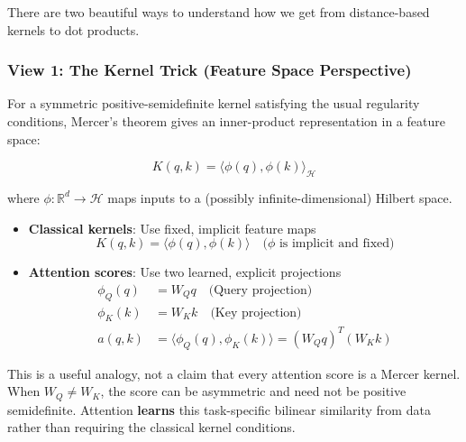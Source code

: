 \documentclass{article}
\begin{document}
There are two beautiful ways to understand how we get from distance-based kernels to dot products.


\subsubsection{View 1: The Kernel Trick (Feature Space Perspective)}

For a symmetric positive-semidefinite kernel satisfying the usual regularity
conditions, Mercer's theorem gives an inner-product representation in a feature
space:

\begin{equation}
K(q, k) = \langle \phi(q), \phi(k) \rangle_{\mathcal{H}}
\end{equation}

where $\phi: \mathbb{R}^d \rightarrow \mathcal{H}$ maps inputs to a (possibly infinite-dimensional) Hilbert space.

\begin{tcolorbox}[colback=green!5!white, colframe=green!50!black, title=Core Insight: Explicit vs. Implicit Feature Maps]
\begin{itemize}
    \item \textbf{Classical kernels}: Use fixed, implicit feature maps
    \begin{equation}
    K(q, k) = \langle \phi(q), \phi(k) \rangle \quad \text{($\phi$ is implicit and fixed)}
    \end{equation}
    
    \item \textbf{Attention scores}: Use two learned, explicit projections
    \begin{align}
    \phi_Q(q) &= W_Q q \quad \text{(Query projection)} \\
    \phi_K(k) &= W_K k \quad \text{(Key projection)} \\
    a(q, k) &= \langle \phi_Q(q), \phi_K(k) \rangle = (W_Q q)^T (W_K k)
    \end{align}
\end{itemize}

This is a useful analogy, not a claim that every attention score is a Mercer kernel.
When $W_Q\ne W_K$, the score can be asymmetric and need not be positive
semidefinite. Attention \textbf{learns} this task-specific bilinear similarity from
data rather than requiring the classical kernel conditions.
\end{tcolorbox}
\end{document}
